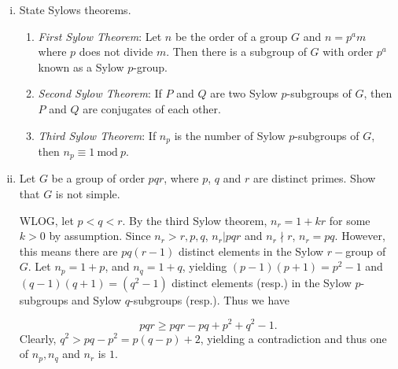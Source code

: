 \documentclass[12pt]{article}
\begin{document}
    \begin{enumerate}[(i)]
        \item State Sylows theorems. 

        \begin{enumerate}
            \item \textit{First Sylow Theorem}: Let $n$ be the order of a group $G$ and $n = p^am$ where $p$ does not divide $m$. Then there is a subgroup of $G$ with order $p^a$ known as a Sylow $p$-group.
            \item \textit{Second Sylow Theorem}: If $P$ and $Q$ are two Sylow $p$-subgroups of $G$, then $P$ and $Q$ are conjugates of each other.

            \item \textit{Third Sylow Theorem}: If $n_p$ is the number of Sylow $p$-subgroups of $G$, then $n_p \equiv 1 \ \mathrm{mod}\  p.$
        \end{enumerate}

        \item Let $G$ be a group of order $pqr$, where $p$, $q$ and $r$ are distinct primes. Show that $G$ is not simple.

        WLOG, let $p < q < r$. By the third Sylow theorem, $n_r = 1 + kr$ for some $k > 0$ by assumption. Since $n_r > r, p, q$, $n_r | pqr$ and $n_r \nmid r$, $n_r = pq$. However, this means there are $pq(r-1)$ distinct elements in the Sylow $r-$group of $G$. Let $n_p = 1 + p$, and $n_q = 1 + q$, yielding $(p - 1)(p + 1) = p^2 - 1$ and $(q-1)(q+1) = (q^2 - 1)$ distinct elements (resp.) in the Sylow $p$-subgroups and Sylow $q$-subgroups (resp.). Thus we have

        $$pqr \geq pqr - pq + p^2 + q^2 -1.$$
        Clearly, $q^2 > pq  - p^2 = p(q - p) + 2$, yielding a contradiction and thus one of $n_p, n_q$ and $n_r$ is $1$.
    \end{enumerate}
\end{document}

